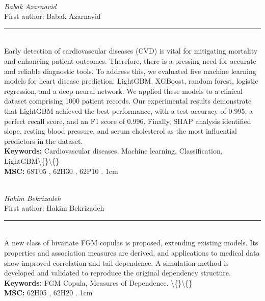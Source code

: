 \documentclass[10pt,twoside]{article}
\begin{document}
\noindent\begin{minipage}[t][\textheight]{\textwidth}
\\[0.35em]
{\itshape Babak Azarnavid}\\[0.2em]
{\footnotesize First author: Babak Azarnavid}\\[0.45em]
\noindent\rule{\textwidth}{0.3pt}\\[0.4em]
{\footnotesize  Early detection of cardiovascular diseases (CVD) is vital for mitigating mortality and enhancing patient outcomes. Therefore, there is a pressing need for accurate and reliable diagnostic tools. To address this, we evaluated five machine learning models for heart disease prediction: LightGBM, XGBoost, random forest, logistic regression, and a deep neural network. We applied these models to a clinical dataset comprising 1000 patient records. Our experimental results demonstrate that LightGBM achieved the best performance, with a test accuracy of 0.995, a perfect recall score, and an F1 score of 0.996. Finally, SHAP analysis identified slope, resting blood pressure, and serum cholesterol as the most influential predictors in the dataset.}\\[0.4em]
{\footnotesize\bfseries Keywords:} {\footnotesize Cardiovascular diseases, Machine learning, Classification, LightGBM\textbackslash\{\}\textbackslash\{\}}\\[0.15em]
{\footnotesize\bfseries MSC:} {\footnotesize 68T05 , 62H30 , 62P10 . 1cm}\\
\vfill
\end{minipage}
\newpage

\noindent\begin{minipage}[t][\textheight]{\textwidth}
\\[0.35em]
{\itshape Hakim Bekrizadeh}\\[0.2em]
{\footnotesize First author: Hakim Bekrizadeh}\\[0.45em]
\noindent\rule{\textwidth}{0.3pt}\\[0.4em]
{\footnotesize  A new class of bivariate FGM copulas is proposed, extending existing models. Its properties and association measures are derived, and applications to medical data show improved correlation and tail dependence. A simulation method is developed and validated to reproduce the original dependency structure.}\\[0.4em]
{\footnotesize\bfseries Keywords:} {\footnotesize FGM Copula, Measures of Dependence. \textbackslash\{\}\textbackslash\{\}}\\[0.15em]
{\footnotesize\bfseries MSC:} {\footnotesize 62H05 , 62H20 . 1cm}\\
\vfill
\end{minipage}
\newpage
\end{document}
